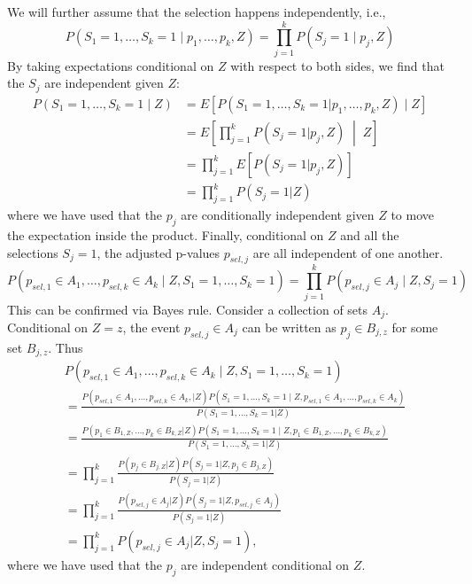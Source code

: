 \documentclass{article}
\begin{document}
\begin{appendix}
We will further assume that the selection happens independently, i.e., 
\begin{equation*}
    P(S_1 = 1, \dots, S_k = 1 \mid p_1, \dots, p_k, Z) = \prod_{j = 1}^k P(S_j = 1 \mid p_j, Z)
\end{equation*} 
By taking expectations conditional on $Z$ with respect to both sides, we find that the $S_j$ are independent given $Z$:
\begin{align*}
    P(S_1 = 1, \dots, S_k = 1 \mid Z) &= E[P(S_1 = 1, \dots, S_k = 1 | p_1, \dots, p_k, Z) \mid Z] \\
    &= E \left[\prod_{j = 1}^k P(S_j = 1 | p_j, Z) \;\middle|\; Z\right]\\
    &= \prod_{j=1}^k E[P(S_j = 1 | p_j, Z)]\\
    &= \prod_{j=1}^k P(S_j = 1 | Z)
\end{align*}
where we have used that the $p_j$ are conditionally independent given $Z$ to move the expectation inside the product. Finally, conditional on $Z$ and all the selections $S_j=1$, the adjusted p-values $p_{sel, j}$ are all independent of one another. 
\begin{equation*}
    P(p_{sel, 1} \in A_1, \dots, p_{sel, k} \in A_k \mid Z, S_1 = 1, \dots, S_k = 1) = \prod_{j=1}^k P(p_{sel, j} \in A_j \mid Z, S_j = 1)
\end{equation*}
This can be confirmed via Bayes rule. Consider a collection of sets $A_j$. Conditional on $Z=z$, the event $p_{sel, j} \in A_j$ can be written as $p_j \in B_{j, z}$ for some set $B_{j, z}$. Thus
\begin{align*}
    &P(p_{sel, 1} \in A_1, \dots, p_{sel, k} \in A_k \mid Z, S_1 = 1, \dots, S_k = 1) \\
    &= \frac{P(p_{sel, 1} \in A_1, \dots, p_{sel, k} \in A_k, | Z) P( S_1 = 1, \dots, S_k = 1 \mid Z, p_{sel, 1} \in A_1, \dots, p_{sel, k} \in A_k)  }{P(S_1=1, \dots, S_k = 1 | Z)}\\
    &= \frac{P(p_{1} \in B_{1, Z}, \dots, p_{k} \in B_{k, Z} | Z) P( S_1 = 1, \dots, S_k = 1 \mid Z, p_{1} \in B_{1, Z}, \dots, p_{k} \in B_{k, Z})  }{P(S_1=1, \dots, S_k = 1 | Z)}\\
    &= \prod_{j=1}^k \frac{ P(p_j \in B_{j, Z} |Z) P(S_j = 1 | Z, p_j \in B_{j, Z})}{P(S_j = 1 | Z) }\\
    &= \prod_{j=1}^k \frac{ P(p_{sel, j} \in A_j |Z) P(S_j = 1 | Z, p_{sel, j} \in A_j)}{P(S_j = 1 | Z) }\\
    &= \prod_{j = 1}^k P(p_{sel, j} \in A_j | Z, S_j=1),
\end{align*}
where we have used that the $p_j$ are independent conditional on $Z$.


\end{appendix}
\end{document}
